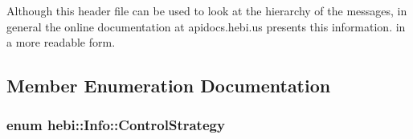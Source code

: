 Although this header file can be used to look at the hierarchy of the messages, in general the online documentation at apidocs.\+hebi.\+us presents this information. in a more readable form. 

\subsection{Member Enumeration Documentation}
\subsubsection[{\texorpdfstring{Control\+Strategy}{ControlStrategy}}]{\setlength{\rightskip}{0pt plus 5cm}enum {\bf hebi\+::\+Info\+::\+Control\+Strategy}}\hypertarget{classhebi_1_1Info_a154026587295ad17a3e1460f32dab668}{}\label{classhebi_1_1Info_a154026587295ad17a3e1460f32dab668}
